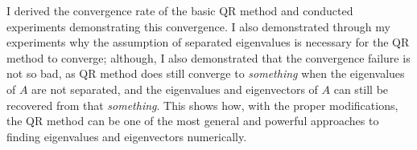 \documentclass{article}
\begin{document}
I derived the convergence rate of the basic QR method and conducted experiments demonstrating this convergence. I also demonstrated through my experiments why the assumption of separated eigenvalues is necessary for the QR method to converge; although, I also demonstrated that the convergence failure is not so bad, as QR method does still converge to \emph{something} when the eigenvalues of $A$ are not separated, and the eigenvalues and eigenvectors of $A$ can still be recovered from that \emph{something}. This shows how, with the proper modifications, the QR method can be one of the most general and powerful approaches to finding eigenvalues and eigenvectors numerically.


\clearpage


\end{document}
